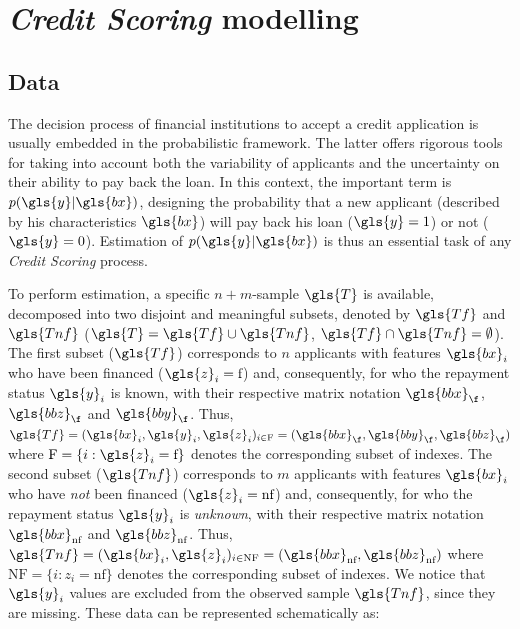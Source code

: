 \section{\textit{Credit Scoring} modelling} \label{sec:criteres}

\subsection{Data} 

The decision process of financial institutions to accept a credit application is usually embedded in the  probabilistic framework. The latter offers rigorous tools for taking into account both the variability of applicants and the uncertainty on their ability to pay back the loan. In this context, the important term is $p(\gls{y}|\gls{bx})$, designing the probability that a new applicant (described by his characteristics $\gls{bx}$) will pay back his loan ($\gls{y}=1$) or not ($\gls{y}=0$). Estimation of $p(\gls{y}|\gls{bx})$ is thus an essential task of any \textit{Credit Scoring} process.

To perform estimation, a specific $n + m$-sample $\gls{T}$ is available, decomposed into two disjoint and meaningful subsets, denoted by $\gls{Tf}$ and $\gls{Tnf}$ ($\gls{T}=\gls{Tf} \cup \gls{Tnf}$, $\gls{Tf} \cap \gls{Tnf}=\emptyset$). The first subset ($\gls{Tf}$) corresponds to $n$ applicants with features $\gls{bx}_i$ who have been financed ($\gls{z}_i={\text{f}}$) and, consequently, for who the repayment status $\gls{y}_i$ is known, with their respective matrix notation $\gls{bbx}_\f$, $\gls{bbz}_\f$ and $\gls{bby}_\f$. Thus, $\gls{Tf}=(\gls{bx}_i,\gls{y}_i,\gls{z}_i)_{i\in \text{F}} = (\gls{bbx}_\f,\gls{bby}_\f,\gls{bbz}_\f)$ where $\text{F}=\{i:\gls{z}_i={\text{f}}\}$ denotes the corresponding subset of indexes. The second subset ($\gls{Tnf}$) corresponds to $m$ applicants with features $\gls{bx}_i$ who have {\it not} been financed ($\gls{z}_i={\text{nf}}$) and, consequently, for who the repayment status $\gls{y}_i$ is {\it unknown}, with their respective matrix notation $\gls{bbx}_{\text{nf}}$ and $\gls{bbz}_{\text{nf}}$. Thus, $\gls{Tnf}=(\gls{bx}_i,\gls{z}_i)_{i\in \text{NF}} = (\gls{bbx}_{\text{nf}}, \gls{bbz}_{\text{nf}})$ where $\text{NF}=\{i:z_i={\text{nf}}\}$ denotes the corresponding subset of indexes. We notice that $\gls{y}_i$ values are excluded from the observed sample $\gls{Tnf}$, since they are missing. These data can be represented schematically as:

